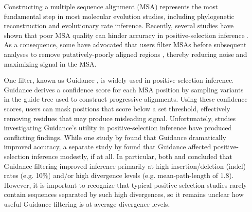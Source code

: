 \documentclass[11pt]{article}
\begin{document}
Constructing a multiple sequence alignment (MSA) represents the most fundamental step in most molecular evolution studies, including phylogenetic reconstruction and evolutionary rate inference. Recently, several studies have shown that poor MSA quality can hinder accuracy in positive-selection inference  \citep{Schneider2009, Fletcher2010, MarkovaRaina2011}. As a consequence, some have advocated that users filter MSAs before subsequent analyses to remove putatively-poorly aligned regions \citep{Privman2012,Jordan2012}, thereby reducing noise and maximizing signal in the MSA.

One filter, known as Guidance \citep{Penn2010}, is widely used in positive-selection inference. Guidance derives a confidence score for each MSA position by sampling variants in the guide tree used to construct progressive alignments. Using these confidence scores, users can mask positions that score below a set threshold, effectively removing residues that may produce misleading signal. Unfortunately, studies investigating Guidance's utility in positive-selection inference have produced conflicting findings. While one study by \citet{Privman2012} found that Guidance dramatically improved accuracy, a separate study by \citet{Jordan2012} found that Guidance affected positive-selection inference modestly, if at all. In particular, both \citet{Privman2012} and \citet{Jordan2012} concluded that Guidance filtering improved inference primarily at high insertion/deletion (indel) rates (e.g. 10\%) and/or high divergence levels (e.g. mean-path-length of 1.8). However, it is important to recognize that typical positive-selection studies rarely contain sequences separated by such high divergences, so it remains unclear how useful Guidance filtering is at average divergence levels.
\end{document}
